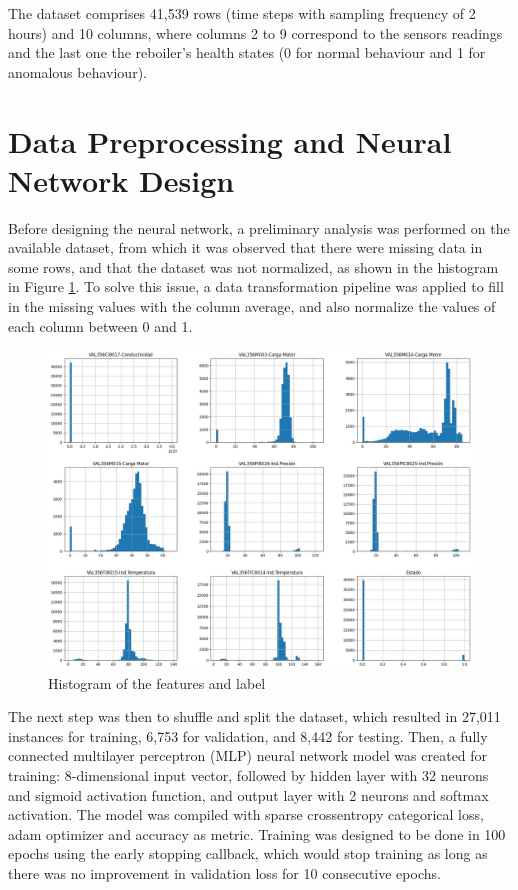 \documentclass[a4paper,fleqn]{cas-sc}
\begin{document}
	The dataset comprises 41,539 rows (time steps with sampling frequency of 2 hours) and 10 columns, where columns 2 to 9 correspond to the sensors readings and the last one the reboiler’s health states (0 for normal behaviour and 1 for anomalous behaviour).

	\section{Data Preprocessing and Neural Network Design}\label{sec:nn-design}
	Before designing the neural network, a preliminary analysis was performed on the available dataset, from which it was observed that there were missing data in some rows, and that the dataset was not normalized, as shown in the histogram in Figure \ref{fig:histogram}. To solve this issue, a data transformation pipeline was applied to fill in the missing values with the column average, and also normalize the values of each column between 0 and 1.
	
	\begin{figure}[h]
		\centering
		\includegraphics[width=1\linewidth]{figures/histogram.jpg}
		\caption{Histogram of the features and label}
		\label{fig:histogram}
	\end{figure}	

	The next step was then to shuffle and split the dataset, which resulted in 27,011 instances for training, 6,753 for validation, and 8,442 for testing. Then, a fully connected multilayer perceptron (MLP) neural network model was created for training: 8-dimensional input vector, followed by hidden layer with 32 neurons and sigmoid activation function, and output layer with 2 neurons and softmax activation. The model was compiled with sparse crossentropy categorical loss, adam optimizer and accuracy as metric. Training was designed to be done in 100 epochs using the early stopping callback, which would stop training as long as there was no improvement in validation loss for 10 consecutive epochs.
	
\end{document}
